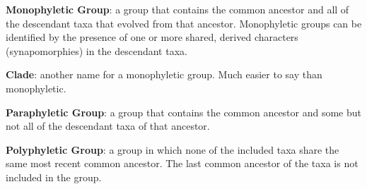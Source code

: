\documentclass[letterpaper]{tufte-handout}
\begin{document}
\noindent\textbf{Monophyletic Group}: a group that contains the common ancestor and all of the descendant taxa that evolved from that ancestor. Monophyletic groups can be identified by the presence of one or more shared, derived characters (synapomorphies) in the descendant taxa.

\noindent\textbf{Clade}: another name for a monophyletic group.  Much easier to say than monophyletic.

\noindent\textbf{Paraphyletic Group}: a group that contains the common ancestor and some but not all of the descendant taxa of that ancestor. 

\noindent\textbf{Polyphyletic Group}: a group in which none of the included taxa share the same most recent common ancestor.  The last common ancestor of the taxa is not included in the group.
\end{document}
